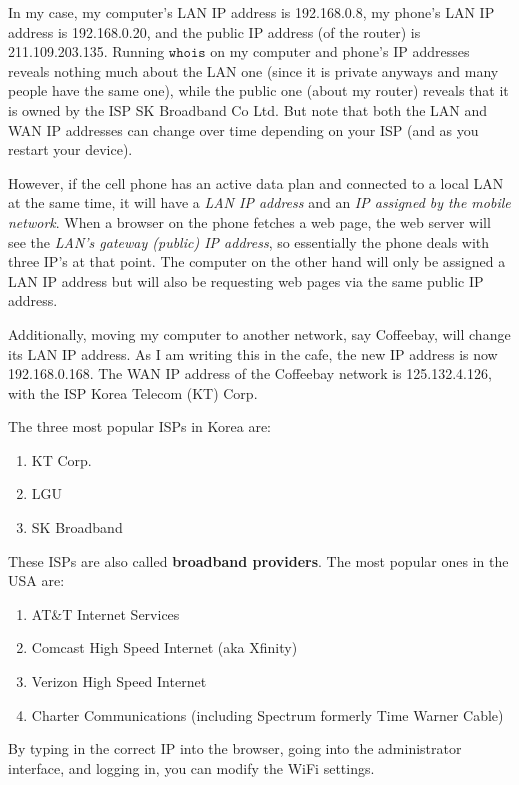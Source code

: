\documentclass{article}
\begin{document}
  \begin{example}
  In my case, my computer's LAN IP address is 192.168.0.8, my phone's LAN IP address is 192.168.0.20, and the public IP address (of the router) is 211.109.203.135. Running $\texttt{whois}$ on my computer and phone's IP addresses reveals nothing much about the LAN one (since it is private anyways and many people have the same one), while the public one (about my router) reveals that it is owned by the ISP SK Broadband Co Ltd. But note that both the LAN and WAN IP addresses can change over time depending on your ISP (and as you restart your device). 

  However, if the cell phone has an active data plan and connected to a local LAN at the same time, it will have a \textit{LAN IP address} and an \textit{IP assigned by the mobile network}. When a browser on the phone fetches a web page, the web server will see the \textit{LAN’s gateway (public) IP address}, so essentially the phone deals with three IP’s at that point. The computer on the other hand will only be assigned a LAN IP address but will also be requesting web pages via the same public IP address. 

  Additionally, moving my computer to another network, say Coffeebay, will change its LAN IP address. As I am writing this in the cafe, the new IP address is now 192.168.0.168. The WAN IP address of the Coffeebay network is 125.132.4.126, with the ISP Korea Telecom (KT) Corp. 
  \end{example}

  The three most popular ISPs in Korea are: 
  \begin{enumerate}
      \item KT Corp. 
      \item LGU
      \item SK Broadband 
  \end{enumerate}
  These ISPs are also called \textbf{broadband providers}. The most popular ones in the USA are:
  \begin{enumerate}
      \item AT\&T Internet Services
      \item Comcast High Speed Internet (aka Xfinity)
      \item Verizon High Speed Internet
      \item Charter Communications (including Spectrum formerly Time Warner Cable)
  \end{enumerate}

  By typing in the correct IP into the browser, going into the administrator interface, and logging in, you can modify the WiFi settings.  
\end{document}
